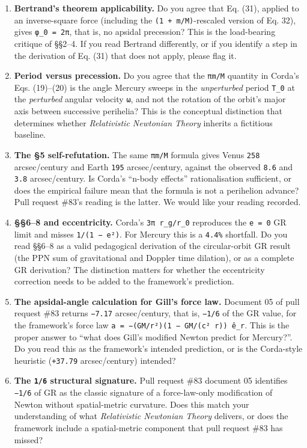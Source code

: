 \documentclass[
  11pt,
]{article}
\begin{document}
\begin{enumerate}
\def\labelenumi{\arabic{enumi}.}
\item
  \textbf{Bertrand's theorem applicability.} Do you agree that Eq. (31),
  applied to an inverse-square force (including the
  \texttt{(1\ +\ m/M)}-rescaled version of Eq. 32), gives
  \texttt{φ\_0\ =\ 2π}, that is, no apsidal precession? This is the
  load-bearing critique of §§2--4. If you read Bertrand differently, or
  if you identify a step in the derivation of Eq. (31) that does not
  apply, please flag it.
\item
  \textbf{Period versus precession.} Do you agree that the \texttt{πm/M}
  quantity in Corda's Eqs. (19)--(20) is the angle Mercury sweeps in the
  \emph{unperturbed} period \texttt{T\_0} at the \emph{perturbed}
  angular velocity \texttt{ω}, and not the rotation of the orbit's major
  axis between successive perihelia? This is the conceptual distinction
  that determines whether \emph{Relativistic Newtonian Theory} inherits
  a fictitious baseline.
\item
  \textbf{The §5 self-refutation.} The same \texttt{πm/M} formula gives
  Venus \texttt{258} arcsec/century and Earth \texttt{195}
  arcsec/century, against the observed \texttt{8.6} and \texttt{3.8}
  arcsec/century. Is Corda's ``n-body effects'' rationalisation
  sufficient, or does the empirical failure mean that the formula is not
  a perihelion advance? Pull request \#83's reading is the latter. We
  would like your reading recorded.
\item
  \textbf{§§6--8 and eccentricity.} Corda's \texttt{3π\ r\_g/r\_0}
  reproduces the \texttt{e\ =\ 0} GR limit and misses
  \texttt{1/(1\ −\ e²)}. For Mercury this is a \texttt{4.4\%} shortfall.
  Do you read §§6--8 as a valid pedagogical derivation of the
  circular-orbit GR result (the PPN sum of gravitational and Doppler
  time dilation), or as a complete GR derivation? The distinction
  matters for whether the eccentricity correction needs to be added to
  the framework's prediction.
\item
  \textbf{The apsidal-angle calculation for Gill's force law.} Document
  05 of pull request \#83 returns \texttt{−7.17} arcsec/century, that
  is, \texttt{−1/6} of the GR value, for the framework's force law
  \texttt{a\ =\ −(GM/r²)(1\ −\ GM/(c²\ r))\ ê\_r}. This is the proper
  answer to ``what does Gill's modified Newton predict for Mercury?''.
  Do you read this as the framework's intended prediction, or is the
  Corda-style heuristic (\texttt{+37.79} arcsec/century) intended?
\item
  \textbf{The \texttt{1/6} structural signature.} Pull request \#83
  document 05 identifies \texttt{−1/6} of GR as the classic signature of
  a force-law-only modification of Newton without spatial-metric
  curvature. Does this match your understanding of what
  \emph{Relativistic Newtonian Theory} delivers, or does the framework
  include a spatial-metric component that pull request \#83 has missed?
\end{enumerate}
\end{document}
